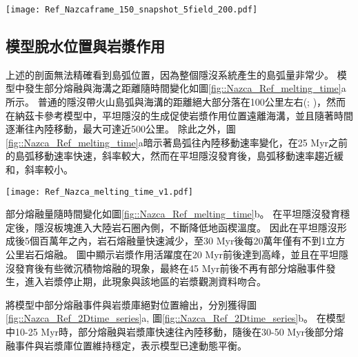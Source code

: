 \begin{figure*}[htp]
    \centering
    \texttt{[image: Ref\_Nazcaframe\_150\_snapshot\_5field\_200.pdf]}
    \caption[納茲卡參考模型於30 Myr時之結果。]{納茲卡參考模型於30 Myr時之結果。}
    \label{fig::Nazca_Ref_150}
\end{figure*}
\newpage
\subsection{模型脫水位置與岩漿作用}
上述的剖面無法精確看到島弧位置，因為整個隱沒系統產生的島弧量非常少。
模型中發生部分熔融與海溝之距離隨時間變化如圖\ref{fig::Nazca_Ref_melting_time}a所示。
普通的隱沒帶火山島弧與海溝的距離絕大部分落在100公里左右(\citealp{peacock1990fluid}; \citealp{hyndman2003serpentinization})，然而在納茲卡參考模型中，平坦隱沒的生成促使岩漿作用位置遠離海溝，並且隨著時間逐漸往內陸移動，最大可達近500公里。
除此之外，圖\ref{fig::Nazca_Ref_melting_time}a暗示著島弧往內陸移動速率變化，在25 Myr之前的島弧移動速率快速，斜率較大，然而在平坦隱沒發育後，島弧移動速率趨近緩和，斜率較小。


\begin{figure*}[hb]
    \centering
    \texttt{[image: Ref\_Nazca\_melting\_time\_v1.pdf]}
    \caption[納茲卡參考模型岩漿作用隨時間變化]{納茲卡參考模型岩漿作用隨時間變化，灰色底標出平坦隱沒發育後時間段。(a)部分熔融與海溝之距離隨時間變化圖，縱軸中每個點代表每次部分熔融發生位置，顏色為指數上的部分熔融比例。(b)岩石熔融量隨時間變化圖，熔融量單位為每單位海溝產生之立方公里量中每20萬年瞬時量。顏色代表不同岩相。}
    \label{fig::Nazca_Ref_melting_time}
\end{figure*}

部分熔融量隨時間變化如圖\ref{fig::Nazca_Ref_melting_time}b。
在平坦隱沒發育穩定後，隱沒板塊進入大陸岩石圈內側，不斷降低地函楔溫度。
因此在平坦隱沒形成後5個百萬年之內，岩石熔融量快速減少，至30 Myr後每20萬年僅有不到1立方公里岩石熔融。
圖中顯示岩漿作用活躍度在20 Myr前後達到高峰，並且在平坦隱沒發育後有些微沉積物熔融的現象，最終在45 Myr前後不再有部分熔融事件發生，進入岩漿停止期，此現象與該地區的岩漿觀測資料吻合。

將模型中部分熔融事件與岩漿庫絕對位置繪出，分別獲得圖\ref{fig::Nazca_Ref_2Dtime_series}a, 圖\ref{fig::Nazca_Ref_2Dtime_series}b。
在模型中10-25 Myr時，部分熔融與岩漿庫快速往內陸移動，隨後在30-50 Myr後部分熔融事件與岩漿庫位置維持穩定，表示模型已達動態平衡。

